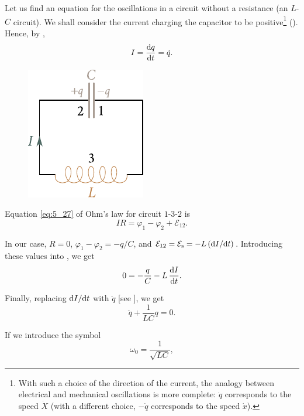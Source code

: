 Let us find an equation for the oscillations in a circuit without a resistance (an $L$-$C$ circuit).
We shall consider the current charging the capacitor to be positive\footnote{With such a choice of the direction of the current, the analogy between electrical and mechanical oscillations is more complete: $\dot{q}$ corresponds to the speed $\dot{X}$ (with a different choice, $-\dot{q}$ corresponds to the speed $\dot{x}$).} ().
Hence, by ,
\begin{equation*}
    I = \dfrac{\mathrm{d} q}{\mathrm{d} t} = \dot{q}.
\end{equation*}

\begin{figure}[t]
	\begin{center}
		\includegraphics[scale=1]{figures/ch_13/fig_13_2.pdf}
		\caption[]{}
		\label{fig:13_2}
	\end{center}
	\vspace{-0.8cm}
\end{figure}

\noindent
Equation \eqref{eq:5_27} of Ohm's law for circuit $1$-$3$-$2$ is
\begin{equation*}
    IR = \varphi_1 - \varphi_2 + \mathcal{E}_{12}.
\end{equation*}

\noindent
In our case, $R=0$, $\varphi_1 - \varphi_2=-q/C$, and $\mathcal{E}_{12}=\mathcal{E}_{\text{s}} = -L\, (\mathrm{d} I/\mathrm{d} t)$.
Introducing these values into , we get
\begin{equation}\label{eq:13_1}
    0 = - \frac{q}{C} - L\, \dfrac{\mathrm{d} I}{\mathrm{d} t}.
\end{equation}

\noindent
Finally, replacing $\mathrm{d} I/\mathrm{d} t$ with $\ddot{q}$ [see ], we get
\begin{equation}\label{eq:13_2}
    \ddot{q} + \frac{1}{LC} q = 0.
\end{equation}

If we introduce the symbol
\begin{equation}\label{eq:13_3}
    \omega_0 = \frac{1}{\sqrt{LC}},
\end{equation}

